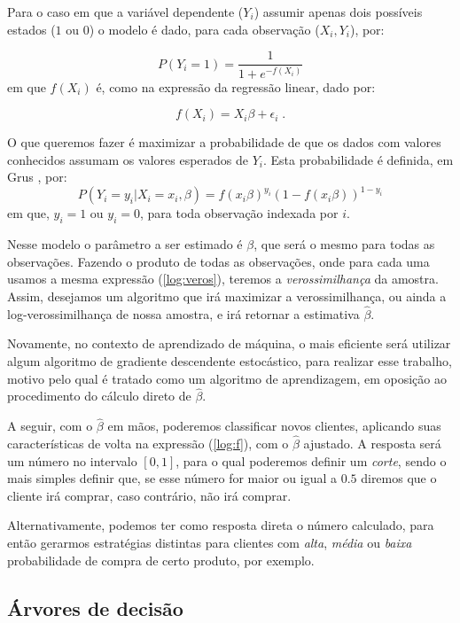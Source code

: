 Para o caso em que a variável dependente ($Y_i$) assumir apenas dois possíveis estados ($1$ ou $0$) o modelo é dado, para cada observação ($X_i, Y_i$), por:

\begin{equation}\label{log:f}
P(Y_i = 1) = \frac{1}{1 + e^{-f(X_i)}}
\end{equation}
em que $f(X_i)$ é, como na expressão da regressão linear, dado por:

\[ f(X_i) =  X_i \beta + \epsilon_i \; . \]

O que queremos fazer é maximizar a probabilidade de que os dados com valores conhecidos assumam os valores esperados de $Y_i$. Esta probabilidade é definida, em Grus \citep{data}, por:
\begin{equation}\label{log:veros}
P(Y_i{=}y_i | X_i{=}x_i, \beta) = f(x_i \beta)^{y_i} (1 - f(x_i \beta))^{1-y_i}
\end{equation}
em que, $y_i = 1$ ou $y_i = 0$, para toda observação indexada por $i$.

Nesse modelo o parâmetro a ser estimado é $\beta$, que será o mesmo para todas as observações. Fazendo o produto de todas as observações, onde para cada uma usamos a mesma expressão (\ref{log:veros}), teremos a \emph{verossimilhança} da amostra. Assim, desejamos um algoritmo que irá maximizar a verossimilhança, ou ainda a log-verossimilhança de nossa amostra, e irá retornar a estimativa $\hat{\beta}$.

Novamente, no contexto de aprendizado de máquina, o mais eficiente será utilizar algum algoritmo de gradiente descendente estocástico, para realizar esse trabalho, motivo pelo qual é tratado como um algoritmo de aprendizagem, em oposição ao procedimento do cálculo direto de $\hat{\beta}$.

A seguir, com o $\hat{\beta}$ em mãos, poderemos classificar novos clientes, aplicando suas características de volta na expressão (\ref{log:f}), com o $\hat{\beta}$ ajustado. A resposta será um número no intervalo $[0, 1]$, para o qual poderemos definir um \emph{corte}, sendo o mais simples definir que, se esse número for maior ou igual a $0.5$ diremos que o cliente irá comprar, caso contrário, não irá comprar.

Alternativamente, podemos ter como resposta direta o número calculado, para então gerarmos estratégias distintas para clientes com \emph{alta}, \emph{média} ou \emph{baixa} probabilidade de compra de certo produto, por exemplo.

\subsection{Árvores de decisão}

